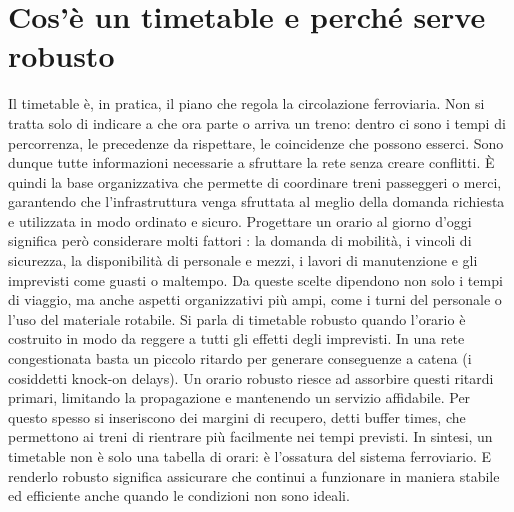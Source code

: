 \documentclass[a4paper,12pt]{report}
\begin{document}
\section{Cos’è un timetable e perché serve robusto}
Il timetable è, in pratica, il piano che regola la circolazione ferroviaria. Non si tratta solo di indicare a che ora parte o arriva un treno: dentro ci sono i tempi di percorrenza, le precedenze da rispettare, le coincidenze che possono esserci. Sono dunque tutte informazioni necessarie a sfruttare la rete senza creare conflitti. 
È quindi la base organizzativa che permette di coordinare treni passeggeri o merci, garantendo che l’infrastruttura venga sfruttata al meglio della domanda richiesta e utilizzata in modo ordinato e sicuro.
Progettare un orario al giorno d'oggi significa però considerare molti fattori : la domanda di mobilità, i vincoli di sicurezza, la disponibilità di personale e mezzi, i lavori di manutenzione e gli imprevisti come guasti o maltempo. Da queste scelte dipendono non solo i tempi di viaggio, ma anche aspetti organizzativi più ampi, come i turni del personale o l’uso del materiale rotabile.
Si parla di timetable robusto quando l’orario è costruito in modo da reggere a tutti gli effetti degli imprevisti. In una rete congestionata basta un piccolo ritardo per generare conseguenze a catena (i cosiddetti knock-on delays). Un orario robusto riesce ad assorbire questi ritardi primari, limitando la propagazione e mantenendo un servizio affidabile. Per questo spesso si inseriscono dei margini di recupero, detti buffer times, che permettono ai treni di rientrare più facilmente nei tempi previsti.
In sintesi, un timetable non è solo una tabella di orari: è l’ossatura del sistema ferroviario. E renderlo robusto significa assicurare che continui a funzionare in maniera stabile ed efficiente anche quando le condizioni non sono ideali.
\end{document}
